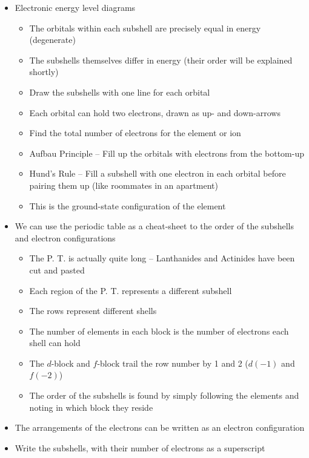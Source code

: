 \documentclass[12pt, openany, letterpaper]{memoir}
\begin{document}
\begin{itemize}
  \item Electronic energy level diagrams
  \begin{itemize}
    \item The orbitals within each subshell are precisely equal in energy (degenerate)
    \item The subshells themselves differ in energy (their order will be explained shortly)
    \item Draw the subshells with one line for each orbital
    \item Each orbital can hold two electrons, drawn as up- and down-arrows
    \item Find the total number of electrons for the element or ion
    \item Aufbau Principle -- Fill up the orbitals with electrons from the bottom-up
    \item Hund's Rule -- Fill a subshell with one electron in each orbital before pairing them up (like roommates in an apartment)
    \item This is the ground-state configuration of the element
  \end{itemize}
  \item We can use the periodic table as a cheat-sheet to the order of the subshells and electron configurations
	      \begin{itemize}
		      \item The P. T. is actually quite long -- Lanthanides and Actinides have been cut and pasted
		      \item Each region of the P. T. represents a different subshell
		      \item The rows represent different shells
		      \item The number of elements in each block is the number of electrons each shell can hold
		      \item The $d$-block and $f$-block trail the row number by 1 and 2 ($d(-1)$ and $f(-2)$)
		      \item The order of the subshells is found by simply following the elements and noting in which block they reside
	      \end{itemize}
	\item The arrangements of the electrons can be written as an electron configuration
	\item Write the subshells, with their number of electrons as a superscript


\end{itemize}
\end{document}
